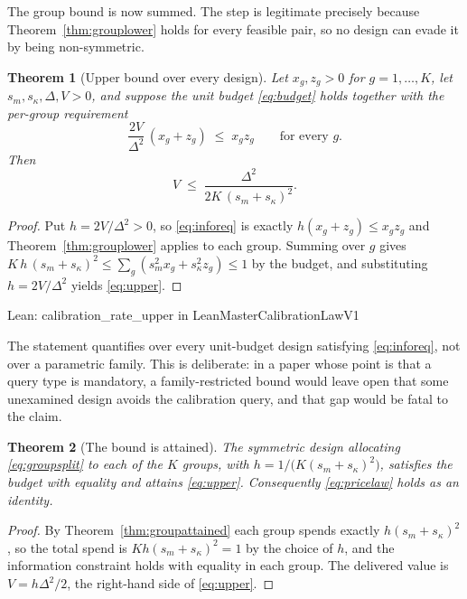 \documentclass[conference]{IEEEtran}
\newtheorem{theorem}{Theorem}
\theoremstyle{definition}
\newcommand{\lean}[1]{\textsf{\footnotesize #1}}
\newcommand{\leanbox}[1]{%
  \par\vspace{2pt}\noindent
  {\footnotesize\textsf{Lean: #1}}\par\vspace{2pt}}
\begin{document}
The group bound is now summed. The step is legitimate precisely because
Theorem~\ref{thm:grouplower} holds for every feasible pair, so no design can evade it by
being non-symmetric.

\begin{theorem}[Upper bound over every design]
\label{thm:upper}
Let $x_{g},z_{g}>0$ for $g=1,\dots,K$, let $s_{m},s_{\kappa},\Delta,V>0$, and suppose the
unit budget \eqref{eq:budget} holds together with the per-group requirement
\begin{equation}
\frac{2V}{\Delta^{2}}\,(x_{g}+z_{g}) \;\le\; x_{g}z_{g}
\qquad\text{for every } g .
\label{eq:inforeq}
\end{equation}
Then
\begin{equation}
V \;\le\; \frac{\Delta^{2}}{2K\,(s_{m}+s_{\kappa})^{2}} .
\label{eq:upper}
\end{equation}
\end{theorem}

\begin{proof}
Put $h=2V/\Delta^{2}>0$, so \eqref{eq:inforeq} is exactly $h(x_{g}+z_{g})\le x_{g}z_{g}$ and
Theorem~\ref{thm:grouplower} applies to each group. Summing over $g$ gives
$K\,h\,(s_{m}+s_{\kappa})^{2}\le\sum_{g}(s_{m}^{2}x_{g}+s_{\kappa}^{2}z_{g})\le1$ by the
budget, and substituting $h=2V/\Delta^{2}$ yields \eqref{eq:upper}.
\end{proof}

\leanbox{\lean{calibration\_rate\_upper} in \lean{LeanMasterCalibrationLawV1}}

The statement quantifies over every unit-budget design satisfying \eqref{eq:inforeq}, not
over a parametric family. This is deliberate: in a paper whose point is that a query type is
mandatory, a family-restricted bound would leave open that some unexamined design avoids the
calibration query, and that gap would be fatal to the claim.

\begin{theorem}[The bound is attained]
\label{thm:attained}
The symmetric design allocating \eqref{eq:groupsplit} to each of the $K$ groups, with
$h=1/\bigl(K(s_{m}+s_{\kappa})^{2}\bigr)$, satisfies the budget with equality and attains
\eqref{eq:upper}. Consequently \eqref{eq:pricelaw} holds as an identity.
\end{theorem}

\begin{proof}
By Theorem~\ref{thm:groupattained} each group spends exactly $h(s_{m}+s_{\kappa})^{2}$, so
the total spend is $Kh(s_{m}+s_{\kappa})^{2}=1$ by the choice of $h$, and the information
constraint holds with equality in each group. The delivered value is
$V=h\Delta^{2}/2$, the right-hand side of \eqref{eq:upper}.
\end{proof}
\end{document}
